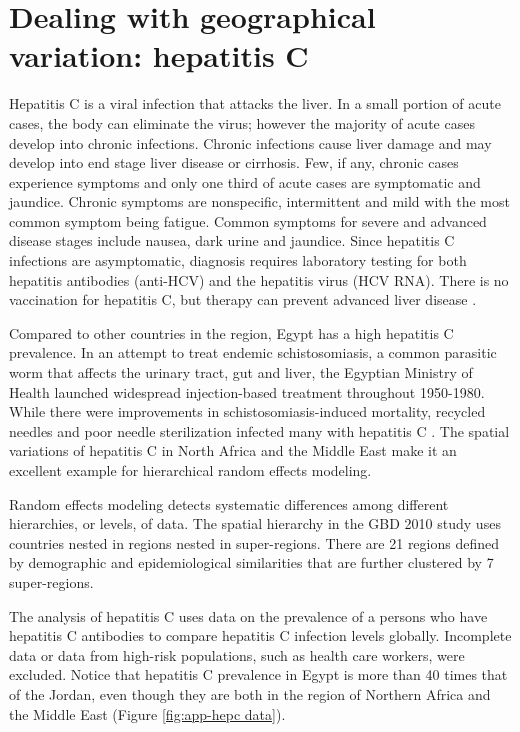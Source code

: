 \chapter{Dealing with geographical variation: hepatitis C}
\label{applications-rfx}

Hepatitis C is a viral infection that attacks the liver.  In a small portion of acute cases, the body can eliminate the virus; however the majority of acute cases develop into chronic infections.  Chronic infections cause liver damage and may develop into end stage liver disease or cirrhosis.  Few, if any, chronic cases experience symptoms and only one third of acute cases are symptomatic and jaundice.  Chronic symptoms are nonspecific, intermittent and mild with the most common symptom being fatigue.  Common symptoms for severe and advanced disease stages include nausea, dark urine and jaundice.  Since hepatitis C infections are asymptomatic, diagnosis requires laboratory testing for both hepatitis antibodies (anti-HCV) and the hepatitis virus (HCV RNA).  There is no vaccination for hepatitis C, but therapy can prevent advanced liver disease \cite{hoofnagle_hepatitis_1997, ghany_diagnosis_2009, hanafiah_global_2012}.

Compared to other countries in the region, Egypt has a high hepatitis C prevalence.  In an attempt to treat endemic schistosomiasis, a common parasitic worm that affects the urinary tract, gut and liver, the Egyptian Ministry of Health launched widespread injection-based treatment throughout 1950-1980.  While there were improvements in schistosomiasis-induced mortality, recycled needles and poor needle sterilization infected many with hepatitis C \cite{frank_role_2000, mezban_hepatitis_2006, strickland_liver_2006}.  The spatial variations of hepatitis C in North Africa and the Middle East make it an excellent example for hierarchical random effects modeling.

Random effects modeling detects systematic differences among different hierarchies, or levels, of data.  The spatial hierarchy in the GBD 2010 study uses countries nested in regions nested in super-regions.  There are 21 regions defined by demographic and epidemiological similarities that are further clustered by 7 super-regions.

The analysis of hepatitis C uses data on the prevalence of a persons who have hepatitis C antibodies to compare hepatitis C infection levels globally.  Incomplete data or data from high-risk populations, such as health care workers, were excluded.  Notice that hepatitis C prevalence in Egypt is more than 40 times that of the Jordan, even though they are both in the region of Northern Africa and the Middle East (Figure \ref{fig:app-hepc data}).

